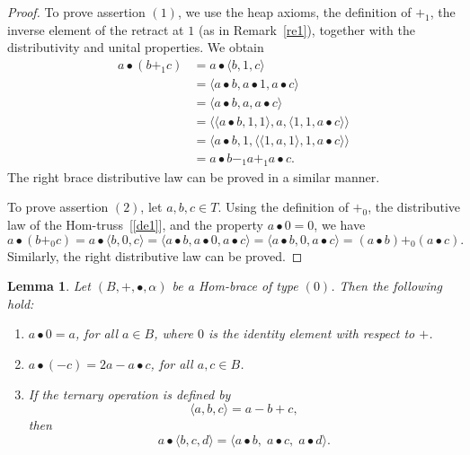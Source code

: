 \documentclass[14pt]{article}
\newtheorem{lemma}[thm]{Lemma}
\theoremstyle{Definition}
\theoremstyle{remark}
\begin{document}
\begin{proof}
To prove assertion $(1)$, we use the heap axioms, the definition of $+_{1}$, the inverse element of the retract at $1$ (as in Remark~\ref{re1}), together with the distributivity and unital properties. We obtain
\begin{align*}
a\bullet(b+_{1}c)&=a\bullet\langle b,1,c\rangle\\
&=\langle a\bullet b,a\bullet 1,a\bullet c\rangle\\
&=\langle a\bullet b,a,a\bullet c\rangle\\
&=\langle\langle a\bullet b,1,1\rangle,a,\langle 1,1,a\bullet c\rangle\rangle\\
&=\langle a\bullet b,1,\langle\langle 1,a,1\rangle,1,a\bullet c\rangle\rangle\\
&=a\bullet b-_{1}a+_{1}a\bullet c.
\end{align*}
The right brace distributive law can be proved in a similar manner. 

To prove assertion $(2)$, let $a,b,c\in T$. Using the definition of $+_{0}$, the distributive law of the Hom-truss~[\ref{de1}], and the property $a\bullet 0=0$, we have
\[
a\bullet(b+_{0}c)=a\bullet\langle b,0,c\rangle=\langle a\bullet b,a\bullet 0,a\bullet c\rangle=\langle a\bullet b,0,a\bullet c\rangle=(a\bullet b)+_{0}(a\bullet c).
\]
Similarly, the right distributive law can be proved.
\end{proof}
\begin{lemma}
Let $(B,+,\bullet,\alpha)$ be a Hom-brace of type $(0)$. Then the following hold:
\begin{enumerate}
\item[(1)] $a\bullet 0 = a$, for all $a \in B$, where $0$ is the identity element with respect to $+$.
\item[(2)] $a\bullet(-c) = 2a - a\bullet c$, for all $a,c \in B$.
\item[(3)] If the ternary operation is defined by 
\[
\langle a,b,c\rangle = a - b + c,
\]
then 
\[
a\bullet \langle b,c,d\rangle = \langle a\bullet b,\; a\bullet c,\; a\bullet d\rangle.
\]
\end{enumerate}
\end{lemma}
\end{document}

